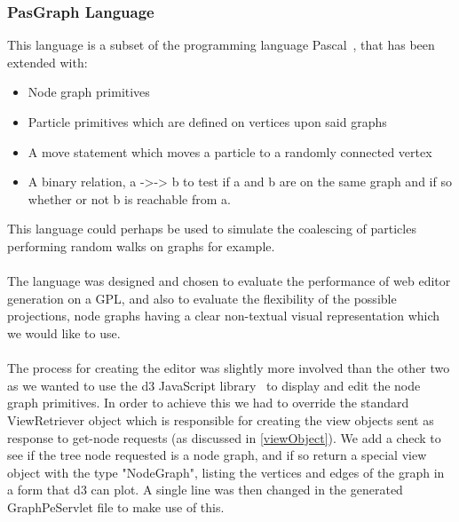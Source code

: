 \documentclass{article}
\begin{document}
\subsubsection{PasGraph Language}\label{pasgraph}
This language is a subset of the programming language Pascal~\cite{pascal}, that has been extended with: 
\begin{itemize}
\item Node graph primitives
\item Particle primitives which are defined on vertices upon said graphs
\item A move statement which moves a particle to a randomly connected vertex
\item A binary relation, a ->-> b to test if a and b are on the same graph and if so whether or not b is reachable from a.
\end{itemize}
This language could perhaps be used to simulate the coalescing of particles performing random walks on graphs for example. 
\\
\\
The language was designed and chosen to evaluate the performance of web editor generation on a GPL, and also to evaluate the flexibility of the possible projections, node graphs having a clear non-textual visual representation which we would like to use.
\\
\\
The process for creating the editor was slightly more involved than the other two as we wanted to use the d3 JavaScript library~\cite{d3} to display and edit the node graph primitives. In order to achieve this we had to override the standard ViewRetriever object which is responsible for creating the view objects sent as response to get-node requests (as discussed in \ref{viewObject}). We add a check to see if the tree node requested is a node graph, and if so return a special view object with the type "NodeGraph", listing the vertices and edges of the graph in a form that d3 can plot. A single line was then changed in the generated GraphPeServlet file to make use of this.
\\
\\
\end{document}
